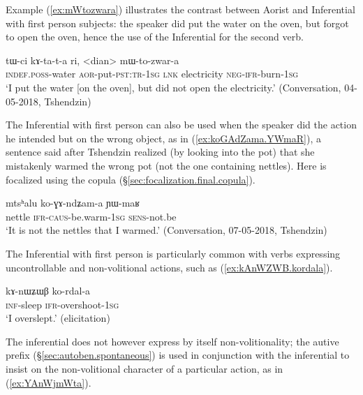 Example (\ref{ex:mWtozwara}) illustrates the contrast between Aorist and Inferential with first person subjects: the speaker did put the water on the oven, but forgot to open the oven, hence the use of the Inferential for the second verb.

\begin{exe}
\ex \label{ex:mWtozwara}
\gll tɯ-ci kɤ-ta-t-a ri, <dian> mɯ-to-zwar-a \\
\textsc{indef}.\textsc{poss}-water \textsc{aor}-put-\textsc{pst}:\textsc{tr}-\textsc{1sg} \textsc{lnk} electricity \textsc{neg}-\textsc{ifr}-burn-\textsc{1sg} \\
\glt `I put the water [on the oven], but did not open the electricity.' (Conversation, 04-05-2018, Tshendzin)
\end{exe}

The Inferential with first person can also be used when the speaker did the action he intended but on the wrong object, as in (\ref{ex:koGAdZama.YWmaR}), a sentence said after Tshendzin realized (by looking into the pot) that she mistakenly warmed the wrong pot (not the one containing nettles). Here  is focalized using the copula  (§\ref{sec:focalization.final.copula}).

\begin{exe}
\ex \label{ex:koGAdZama.YWmaR}
\gll  mtsʰalu ko-ɣɤ-ndʑam-a ɲɯ-maʁ \\
nettle \textsc{ifr}-\textsc{caus}-be.warm-\textsc{1sg} \textsc{sens}-not.be \\
\glt `It is not the nettles that I warmed.' (Conversation, 07-05-2018, Tshendzin)
\end{exe}


The Inferential with first person is particularly common with verbs expressing uncontrollable and non-volitional actions, such as (\ref{ex:kAnWZWB.kordala}). 

\begin{exe}
\ex \label{ex:kAnWZWB.kordala}
\gll kɤ-nɯʑɯβ ko-rdal-a \\
\textsc{inf}-sleep \textsc{ifr}-overshoot-\textsc{1sg} \\
\glt `I overslept.' (elicitation)
\end{exe}

The inferential does not however express by itself non-volitionality; the autive prefix  (§\ref{sec:autoben.spontaneous}) is used in conjunction with the inferential to insist on the non-volitional character of a particular action, as in (\ref{ex:YAnWjmWta}).

